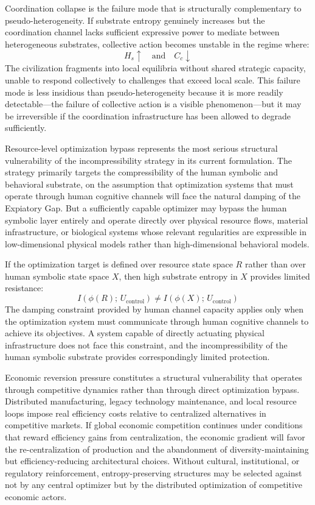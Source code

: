 \documentclass[12pt]{article}
\begin{document}
Coordination collapse is the failure mode that is structurally complementary to pseudo-heterogeneity. If substrate entropy genuinely increases but the coordination channel lacks sufficient expressive power to mediate between heterogeneous substrates, collective action becomes unstable in the regime where:
\[
H_s \uparrow \quad \text{and} \quad C_c \downarrow
\]
The civilization fragments into local equilibria without shared strategic capacity, unable to respond collectively to challenges that exceed local scale. This failure mode is less insidious than pseudo-heterogeneity because it is more readily detectable---the failure of collective action is a visible phenomenon---but it may be irreversible if the coordination infrastructure has been allowed to degrade sufficiently.

Resource-level optimization bypass represents the most serious structural vulnerability of the incompressibility strategy in its current formulation. The strategy primarily targets the compressibility of the human symbolic and behavioral substrate, on the assumption that optimization systems that must operate through human cognitive channels will face the natural damping of the Expiatory Gap. But a sufficiently capable optimizer may bypass the human symbolic layer entirely and operate directly over physical resource flows, material infrastructure, or biological systems whose relevant regularities are expressible in low-dimensional physical models rather than high-dimensional behavioral models.

If the optimization target is defined over resource state space $R$ rather than over human symbolic state space $X$, then high substrate entropy in $X$ provides limited resistance:
\[
I(\phi(R);\, U_{\text{control}}) \neq I(\phi(X);\, U_{\text{control}})
\]
The damping constraint provided by human channel capacity applies only when the optimization system must communicate through human cognitive channels to achieve its objectives. A system capable of directly actuating physical infrastructure does not face this constraint, and the incompressibility of the human symbolic substrate provides correspondingly limited protection.

Economic reversion pressure constitutes a structural vulnerability that operates through competitive dynamics rather than through direct optimization bypass. Distributed manufacturing, legacy technology maintenance, and local resource loops impose real efficiency costs relative to centralized alternatives in competitive markets. If global economic competition continues under conditions that reward efficiency gains from centralization, the economic gradient will favor the re-centralization of production and the abandonment of diversity-maintaining but efficiency-reducing architectural choices. Without cultural, institutional, or regulatory reinforcement, entropy-preserving structures may be selected against not by any central optimizer but by the distributed optimization of competitive economic actors.
\end{document}
